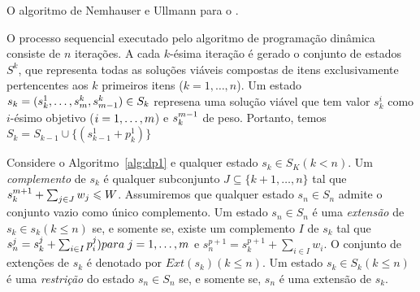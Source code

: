 

\begin{algorithm}
  \caption{O algoritmo de Nemhauser e Ullmann para o \mokp.}
  \label{alg:dp1}
  
\end{algorithm}



O processo sequencial executado pelo algoritmo de programação dinâmica
consiste de $n$ iterações.
A cada $k$-ésima iteração é gerado o conjunto de estados $S^k$,
que representa todas as soluções viáveis compostas de itens exclusivamente
pertencentes aos $k$ primeiros itens ($k = 1, \ldots, n$).
Um estado $s_k = (s_k^1, \ldots, s_m^k, s_{m-1}^k) \in S_k$ represena uma solução
viável que tem valor $s^i_k$ como $i$-ésimo objetivo ($i = 1, \ldots, m$)
e $s^{m-1}_k$ de peso.
Portanto, temos $S_k = S_{k-1} \cup \{(s^1_{k-1}+p^1_k)\}$



\begin{mydef}
Considere o Algoritmo~\ref{alg:dp1} e qualquer estado $s_k \in S_K (k < n)$.
Um \emph{complemento} de $s_k$ é qualquer subconjunto  $J \subseteq \{k+1, \ldots, n\}$
tal que $s_k^{m+1} + \sum_{j \in J} w_j \leqslant W$.
Assumiremos que qualquer estado $s_n \in S_n$ admite o conjunto vazio como único complemento.
Um estado $s_n \in S_n$ é uma \emph{extensão} de $s_k \in s_k (k \leq n )$ se, e somente se,
existe um complemento $I$ de $s_k$ tal que $s_n^j = s_k^j + \sum_{i \in I} p_i^j) para \; j = 1, \ldots, m$
e $s_n^{p+1} = s_k^{p+1} + \sum_{i \in I} w_i$.
O conjunto de extenções de $s_k$ é denotado por $Ext(s_k) (k \leq n)$.
Um estado $s_k \in S_k (k \leq n)$ é uma \emph{restrição} do estado $s_n \in S_n$
se, e somente se, $s_n$ é uma extensão de $s_k$.
\end{mydef}

